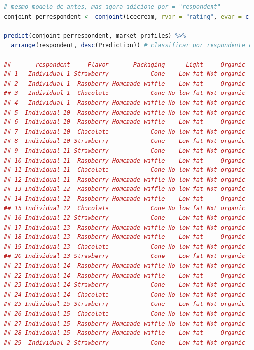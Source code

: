 \documentclass{article}
\begin{document}
\begin{lstlisting}[language=R]
# mesmo modelo de antes, mas agora adicione por = "respondent"
conjoint_perrespondent <- conjoint(icecream, rvar = "rating", evar = c("Flavor","Packaging","Light","Organic"), by = "respondent")

predict(conjoint_perrespondent, market_profiles) %>% 
  arrange(respondent, desc(Prediction)) # classificar por respondente e depois por classificacao prevista
  
##       respondent     Flavor       Packaging      Light     Organic
## 1   Individual 1 Strawberry            Cone    Low fat Not organic
## 2   Individual 1  Raspberry Homemade waffle    Low fat     Organic
## 3   Individual 1  Chocolate            Cone No low fat Not organic
## 4   Individual 1  Raspberry Homemade waffle No low fat Not organic
## 5  Individual 10  Raspberry Homemade waffle No low fat Not organic
## 6  Individual 10  Raspberry Homemade waffle    Low fat     Organic
## 7  Individual 10  Chocolate            Cone No low fat Not organic
## 8  Individual 10 Strawberry            Cone    Low fat Not organic
## 9  Individual 11 Strawberry            Cone    Low fat Not organic
## 10 Individual 11  Raspberry Homemade waffle    Low fat     Organic
## 11 Individual 11  Chocolate            Cone No low fat Not organic
## 12 Individual 11  Raspberry Homemade waffle No low fat Not organic
## 13 Individual 12  Raspberry Homemade waffle No low fat Not organic
## 14 Individual 12  Raspberry Homemade waffle    Low fat     Organic
## 15 Individual 12  Chocolate            Cone No low fat Not organic
## 16 Individual 12 Strawberry            Cone    Low fat Not organic
## 17 Individual 13  Raspberry Homemade waffle No low fat Not organic
## 18 Individual 13  Raspberry Homemade waffle    Low fat     Organic
## 19 Individual 13  Chocolate            Cone No low fat Not organic
## 20 Individual 13 Strawberry            Cone    Low fat Not organic
## 21 Individual 14  Raspberry Homemade waffle No low fat Not organic
## 22 Individual 14  Raspberry Homemade waffle    Low fat     Organic
## 23 Individual 14 Strawberry            Cone    Low fat Not organic
## 24 Individual 14  Chocolate            Cone No low fat Not organic
## 25 Individual 15 Strawberry            Cone    Low fat Not organic
## 26 Individual 15  Chocolate            Cone No low fat Not organic
## 27 Individual 15  Raspberry Homemade waffle No low fat Not organic
## 28 Individual 15  Raspberry Homemade waffle    Low fat     Organic
## 29  Individual 2 Strawberry            Cone    Low fat Not organic

\end{lstlisting}
\end{document}
